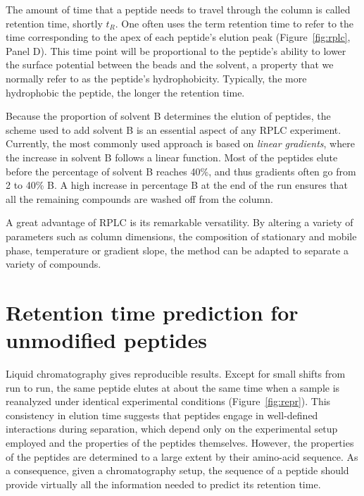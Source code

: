 \documentclass[a4paper]{article}
\begin{document}
The amount of time that a peptide needs to travel through the column
is called retention time, shortly $t_R$. One often uses the term
retention time to refer to the time corresponding to the apex of each
peptide's elution peak (Figure~\ref{fig:rplc}, Panel D). This time
point will be proportional to the peptide's ability to lower the
surface potential between the beads and the solvent, a property that
we normally refer to as the peptide's hydrophobicity.  Typically, the
more hydrophobic the peptide, the longer the retention time.

Because the proportion of solvent B determines the elution of
peptides, the scheme used to add solvent B is an essential aspect of
any RPLC experiment. Currently, the most commonly used approach is
based on {\em linear gradients}, where the increase in solvent B
follows a linear function. Most of the peptides elute before the
percentage of solvent B reaches 40\%, and thus gradients often go from
2 to 40\% B. A high increase in percentage B at the end of the run
ensures that all the remaining compounds are washed off from the
column.

A great advantage of RPLC is its remarkable versatility. By altering a
variety of parameters such as column dimensions, the composition of
stationary and mobile phase, temperature or gradient slope, the method
can be adapted to separate a variety of compounds.

\section{\label{sec:rtpred}Retention time prediction for unmodified peptides}

Liquid chromatography gives reproducible results. Except for small
shifts from run to run, the same peptide elutes at about the same time
when a sample is reanalyzed under identical experimental conditions
(Figure~\ref{fig:repr}). This consistency in elution time suggests
that peptides engage in well-defined interactions during separation,
which depend only on the experimental setup employed and the
properties of the peptides themselves. However, the properties of the
peptides are determined to a large extent by their amino-acid
sequence. As a consequence, given a chromatography setup, the sequence
of a peptide should provide virtually all the information needed to
predict its retention time.
\end{document}
